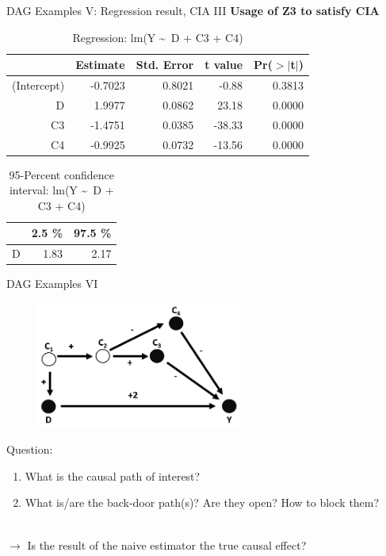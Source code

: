 \documentclass{beamer}\usepackage[]{graphicx}\usepackage[]{xcolor}
\begin{document}
\begin{frame}[fragile]{DAG Examples V: Regression result, CIA III}
\textbf{Usage of Z3 to satisfy CIA}
\begin{table}[ht]
\centering
\begingroup\small
\begin{tabular}{rrrrr}
  \hline
 & Estimate & Std. Error & t value & Pr($>$$|$t$|$) \\ 
  \hline
(Intercept) & -0.7023 & 0.8021 & -0.88 & 0.3813 \\ 
  D & 1.9977 & 0.0862 & 23.18 & 0.0000 \\ 
  C3 & -1.4751 & 0.0385 & -38.33 & 0.0000 \\ 
  C4 & -0.9925 & 0.0732 & -13.56 & 0.0000 \\ 
   \hline
\end{tabular}
\endgroup
\caption{Regression: lm(Y \textasciitilde ~D + C3 + C4)} 
\end{table}
\begin{table}[ht]
\centering
\begingroup\small
\begin{tabular}{rrr}
  \hline
 & 2.5 \% & 97.5 \% \\ 
  \hline
D & 1.83 & 2.17 \\ 
   \hline
\end{tabular}
\endgroup
\caption{95-Percent confidence interval: lm(Y \textasciitilde ~D + C3 + C4)} 
\end{table}

\end{frame}




\begin{frame}{DAG Examples VI}
\\[1em]
\begin{figure}
\centering
\includegraphics[width=0.6\textwidth]{Graphics/6.TwoBack-doorpaths-Covered(missings).png}
\end{figure}
Question:
\begin{enumerate}
\item What is the causal path of interest?
\item What is/are the back-door path(s)? Are they open? How to block them?
\end{enumerate}
\\[1em]
$\rightarrow$ Is the result of the naive estimator the true causal effect?
\end{frame}
\end{document}
